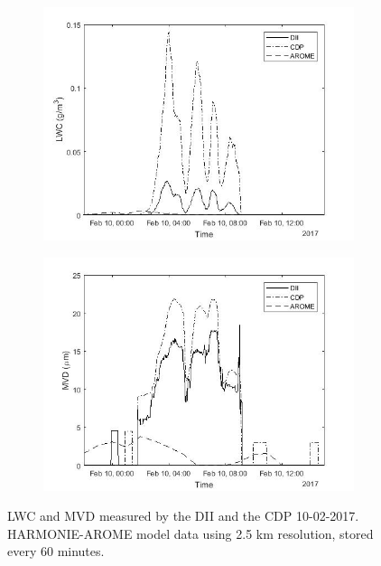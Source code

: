 \begin{figure}[ht]
\centering
\begin{subfigure}[t]{.5\textwidth}
  \centering
  \includegraphics[width=1\linewidth]{figures/170210/30min_lwc_CDP_DII_SMHI_170210_2263part}
  \label{fig:170210_LWCvstime}
\end{subfigure}%
\begin{subfigure}[t]{.5\textwidth}
  \centering
  \includegraphics[width=1\linewidth]{figures/170210/30min_mvd_CDP_DII_SMHI_170210_2263part}
  \label{fig:170210_MVDvstime}
\end{subfigure}
\caption{LWC and MVD measured by the DII and the CDP 10-02-2017. HARMONIE-AROME model data using 2.5 km resolution, stored every 60 minutes.}
\label{fig:170210_lwc_mvd}
\end{figure}


